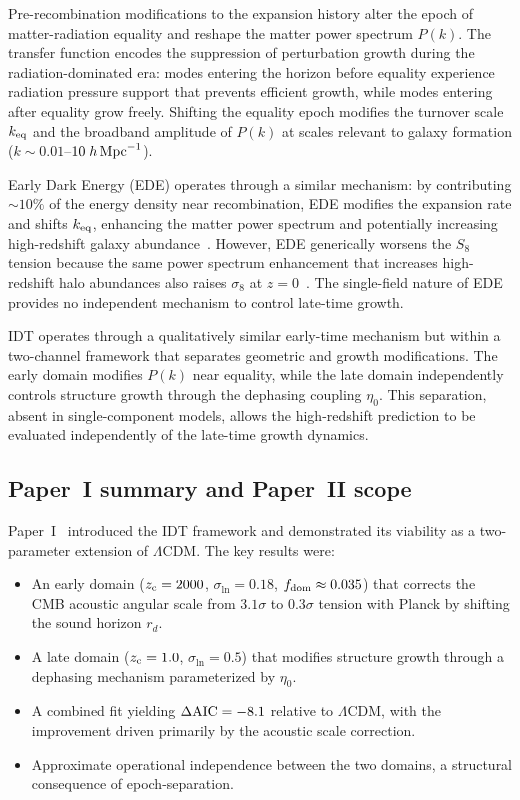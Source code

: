 \documentclass[aps,prd,twocolumn,superscriptaddress,nofootinbib]{revtex4-2}
\newcommand{\fdom}{f_{\rm dom}}
\newcommand{\zc}{z_{\rm c}}
\newcommand{\sln}{\sigma_{\ln}}
\newcommand{\dAIC}{\Delta{\rm AIC}}
\begin{document}
Pre-recombination modifications to the expansion history alter the
epoch of matter-radiation equality and reshape the matter power
spectrum $P(k)$. The transfer function encodes the suppression of
perturbation growth during the radiation-dominated era: modes
entering the horizon before equality experience radiation pressure
support that prevents efficient growth, while modes entering after
equality grow freely. Shifting the equality epoch modifies the
turnover scale $k_{\rm eq}$ and the broadband amplitude of $P(k)$
at scales relevant to galaxy formation ($k \sim 0.01$--$10\;h\,
{\rm Mpc}^{-1}$).

Early Dark Energy (EDE) operates through a similar mechanism: by
contributing $\sim 10\%$ of the energy density near recombination,
EDE modifies the expansion rate and shifts $k_{\rm eq}$, enhancing
the matter power spectrum and potentially increasing high-redshift
galaxy abundance~\cite{Shen2024}. However, EDE generically worsens
the $S_8$ tension because the same power spectrum enhancement that
increases high-redshift halo abundances also raises $\sigma_8$ at
$z = 0$~\cite{Hill2020,Ivanov2020}. The single-field nature of EDE
provides no independent mechanism to control late-time growth.

IDT operates through a qualitatively similar early-time mechanism
but within a two-channel framework that separates geometric and
growth modifications. The early domain modifies $P(k)$ near
equality, while the late domain independently controls structure
growth through the dephasing coupling $\eta_0$. This separation,
absent in single-component models, allows the high-redshift
prediction to be evaluated independently of the late-time growth
dynamics.

\subsection{Paper~I summary and Paper~II scope}
\label{sec:scope}

Paper~I~\cite{Paper1} introduced the IDT framework and demonstrated
its viability as a two-parameter extension of $\Lambda$CDM. The key
results were:
\begin{itemize}
\item An early domain ($\zc = 2000$, $\sln = 0.18$, $\fdom \approx
0.035$) that corrects the CMB acoustic angular scale from
$3.1\sigma$ to $0.3\sigma$ tension with Planck by shifting the
sound horizon $r_d$.
\item A late domain ($\zc = 1.0$, $\sln = 0.5$) that modifies
structure growth through a dephasing mechanism parameterized by
$\eta_0$.
\item A combined fit yielding $\dAIC = -8.1$ relative to
$\Lambda$CDM, with the improvement driven primarily by the
acoustic scale correction.
\item Approximate operational independence between the two domains,
a structural consequence of epoch-separation.
\end{itemize}
\end{document}
